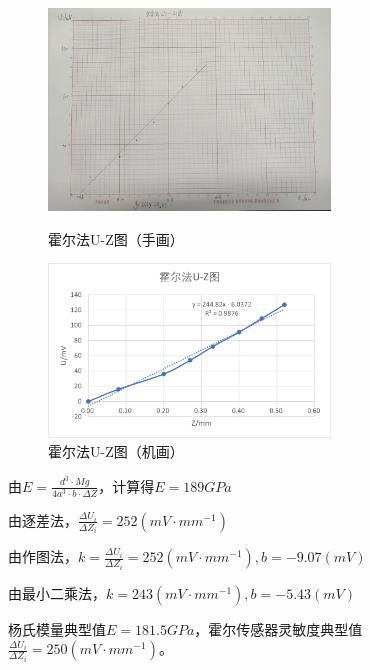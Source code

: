 \documentclass[11pt]{article}
\begin{document}
\begin{figure}[H]
    \centering
    \begin{minipage}[t]{0.49\linewidth}
        \centering
        \includegraphics[width=7.5cm]{Fig/5.jpg}
        \caption{霍尔法U-Z图（手画）}
        \label{fig:5}
    \end{minipage}
    \begin{minipage}[t]{0.49\linewidth}
        \centering
        \includegraphics[width=7.5cm]{Fig/6.png}
        \caption{霍尔法U-Z图（机画）}
        \label{fig:6}
    \end{minipage}
\end{figure}
\par 由$E=\frac{d^3\cdot M g}{4a^3\cdot b\cdot\Delta Z}$，计算得$E=189GPa$
\par 由逐差法，$\frac{\Delta U_i}{\Delta Z_i}=252(mV\cdot {mm}^{-1})$
\par 由作图法，$k=\frac{\Delta U_i}{\Delta Z_i}=252 (mV\cdot {mm}^{-1}),b=-9.07(mV)$
\par 由最小二乘法，$k=243(mV\cdot {mm}^{-1}),b=-5.43(mV)$
\par 杨氏模量典型值$E=181.5GPa$，霍尔传感器灵敏度典型值$\frac{\Delta U_i}{\Delta Z_i}=250(mV\cdot {mm}^{-1})$。
\end{document}
